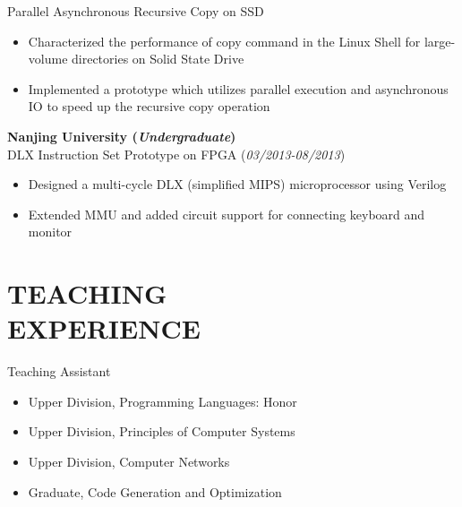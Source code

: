 \documentclass[margin, 9pt]{res} %
\begin{document}
\begin{resume}
\medskip
Parallel Asynchronous Recursive Copy on SSD\\
\vspace*{-10pt}
\begin{itemize}[leftmargin=*] \itemsep -3pt
\vspace*{-5pt}
	\item Characterized the performance of copy command in the Linux Shell for large-volume directories on Solid State Drive
	\item Implemented a prototype which utilizes parallel execution and asynchronous IO to speed up the recursive copy operation
\end{itemize}

\bigskip
{\large\textbf{Nanjing University (\textit{Undergraduate})}}\\

\vspace*{-7pt}
DLX Instruction Set Prototype on FPGA \hfill(\textit{03/2013-08/2013})\\
\vspace*{-10pt}
\begin{itemize}[leftmargin=*] \itemsep -3pt
\vspace*{-5pt}
	\item Designed a multi-cycle DLX (simplified MIPS) microprocessor using Verilog
	\item Extended MMU and added circuit support for connecting keyboard and monitor
\end{itemize}


\section{TEACHING\\ EXPERIENCE} 

{\large{Teaching Assistant}}\\
\vspace*{-5pt}
\begin{itemize}[leftmargin=*] \itemsep -2pt
\vspace*{-5pt}
	\item Upper Division, Programming Languages: Honor
	\item Upper Division, Principles of Computer Systems
	\item Upper Division, Computer Networks
	\item Graduate, Code Generation and Optimization
\end{itemize}


\end{resume}
\end{document}
